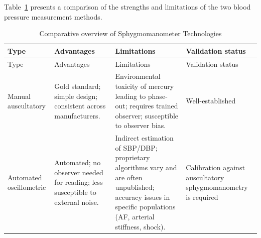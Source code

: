 \documentclass[
  12pt,
  letterpaper,
  openany,
  oneside]{book}
\begin{document}
Table~\ref{tbl-sphygmo-comparison} presents a comparison of the
strengths and limitations of the two blood pressure measurement methods.

\begin{longtable}[]{@{}
  >{\raggedright\arraybackslash}p{}
  >{\raggedright\arraybackslash}p{}
  >{\raggedright\arraybackslash}p{}
  >{\raggedright\arraybackslash}p{}@{}}
\caption{Comparative overview of Sphygmomanometer
Technologies}\label{tbl-sphygmo-comparison}\tabularnewline
\toprule\noalign{}
\begin{minipage}[b]{\linewidth}\raggedright
Type
\end{minipage} & \begin{minipage}[b]{\linewidth}\raggedright
Advantages
\end{minipage} & \begin{minipage}[b]{\linewidth}\raggedright
Limitations
\end{minipage} & \begin{minipage}[b]{\linewidth}\raggedright
Validation status
\end{minipage} \\
\midrule\noalign{}
\endfirsthead
\toprule\noalign{}
\begin{minipage}[b]{\linewidth}\raggedright
Type
\end{minipage} & \begin{minipage}[b]{\linewidth}\raggedright
Advantages
\end{minipage} & \begin{minipage}[b]{\linewidth}\raggedright
Limitations
\end{minipage} & \begin{minipage}[b]{\linewidth}\raggedright
Validation status
\end{minipage} \\
\midrule\noalign{}
\endhead
\bottomrule\noalign{}
\endlastfoot
Manual auscultatory & Gold standard; simple design; consistent across
manufacturers. & Environmental toxicity of mercury leading to phase-out;
requires trained observer; susceptible to observer bias. &
Well-established \\
Automated oscillometric & Automated; no observer needed for reading;
less susceptible to external noise. & Indirect estimation of SBP/DBP;
proprietary algorithms vary and are often unpublished; accuracy issues
in specific populations (AF, arterial stiffness, shock). & Calibration
against auscultatory sphygmomanometry is required \\
\end{longtable}
\end{document}
